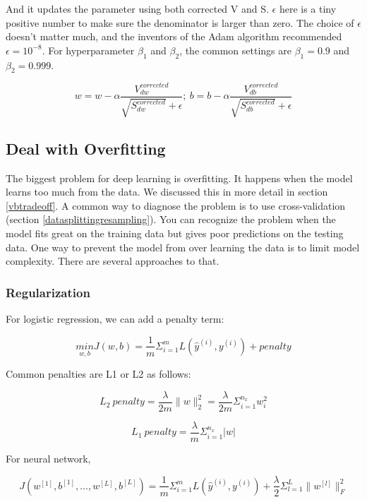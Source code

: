 \documentclass[
  12pt,
]{krantz}
\begin{document}
And it updates the parameter using both corrected V and S. \(\epsilon\) here is a tiny positive number to make sure the denominator is larger than zero. The choice of \(\epsilon\) doesn't matter much, and the inventors of the Adam algorithm recommended \(\epsilon = 10^{-8}\). For hyperparameter \(\beta_1\) and \(\beta_2\), the common settings are \(\beta_1 = 0.9\) and \(\beta_2 = 0.999\).

\[w=w-\alpha \frac{V_{dw}^{corrected}}{\sqrt{S_{dw}^{corrected}} +\epsilon};\ b=b-\alpha\frac{V_{db}^{corrected}}{\sqrt{S_{db}^{corrected}}+\epsilon}\]

\hypertarget{deal-with-overfitting}{%
\subsection{Deal with Overfitting}\label{deal-with-overfitting}}

The biggest problem for deep learning is overfitting. It happens when the model learns too much from the data. We discussed this in more detail in section \ref{vbtradeoff}. A common way to diagnose the problem is to use cross-validation (section \ref{datasplittingresampling}). You can recognize the problem when the model fits great on the training data but gives poor predictions on the testing data. One way to prevent the model from over learning the data is to limit model complexity. There are several approaches to that.

\hypertarget{regularization}{%
\subsubsection{Regularization}\label{regularization}}

For logistic regression, we can add a penalty term:

\[\underset{w,b}{min}J(w,b)= \frac{1}{m} \Sigma_{i=1}^{m}L(\hat{y}^{(i)}, y^{(i)}) + penalty\]

Common penalties are L1 or L2 as follows:

\[L_2\ penalty=\frac{\lambda}{2m}\parallel w \parallel_2^2 = \frac{\lambda}{2m}\Sigma_{i=1}^{n_x}w_i^2\]

\[L_1\ penalty = \frac{\lambda}{m}\Sigma_{i=1}^{n_x}|w|\]

For neural network,

\[J(w^{[1]},b^{[1]},\dots,w^{[L]},b^{[L]})=\frac{1}{m}\Sigma_{i=1}^{m}L(\hat{y}^{(i)},y^{(i)}) + \frac{\lambda}{2}\Sigma_{l=1}^{L} \parallel w^{[l]} \parallel^2_F\]
\end{document}
